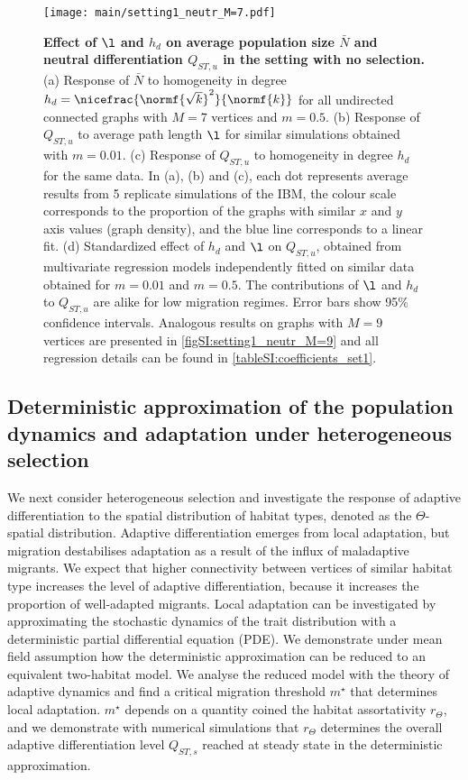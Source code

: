 \begin{figure}[ht]
    \centering
      \texttt{[image: main/setting1\_neutr\_M=7.pdf]}
      \caption{ 
      \textbf{Effect of $\l$ and $h_d$ on average population size $\bar{N}$ and neutral differentiation $Q_{ST,u}$ in the setting with no selection.}
      (a) Response of $\bar{N}$ to homogeneity in degree $h_d = \nicefrac{\normf{\sqrt{k}}^2}{\normf{k}}$ for all undirected connected graphs with $M=7$ vertices and $m=0.5$.
      (b) Response of $Q_{ST,u}$ to average path length $\l$ for similar simulations obtained with $m=0.01$.
      (c) Response of $Q_{ST,u}$ to homogeneity in degree $h_d$ for the same data.
      In (a), (b) and (c), each dot represents average results from 5 replicate simulations of the IBM, the colour scale corresponds to the proportion of the graphs with similar $x$ and $y$ axis values (graph density), and the blue line corresponds to a linear fit. 
      (d) Standardized effect of $h_d$ and $\l$ on $Q_{ST,u}$, obtained from multivariate regression models independently fitted on similar data obtained for $m = 0.01$ and $m=0.5$.
      The contributions of $\l$ and $h_d$ to $Q_{ST,u}$ are alike for low migration regimes. Error bars show 95\% confidence intervals.
      Analogous results on graphs with $M=9$ vertices are presented in \cref{figSI:setting1_neutr_M=9} and all regression details can be found in \cref{tableSI:coefficients_set1}.
       }
      \label{fig:setting1_neutr_M=7}
\end{figure}
\FloatBarrier

\subsection{Deterministic approximation of the population dynamics and adaptation under heterogeneous selection}\label{sec:result2a}

We next consider heterogeneous selection and investigate the response of adaptive differentiation to the spatial distribution of habitat types, denoted as the $\Theta$-spatial distribution. 
%
Adaptive differentiation emerges from local adaptation, but migration destabilises adaptation as a result of the influx of maladaptive migrants. We expect that higher connectivity between vertices of similar habitat type increases the level of adaptive differentiation, because it increases the proportion of well-adapted migrants. Local adaptation can be investigated by approximating the stochastic dynamics of the trait distribution with a deterministic partial differential equation (PDE). We demonstrate under mean field assumption how the deterministic approximation can be reduced to an equivalent two-habitat model. We analyse the reduced model with the theory of adaptive dynamics \citep{Meszena1997,Mirrahimi2020} and find a critical migration threshold $m^\star$ that determines local adaptation. $m^\star$ depends on a quantity coined the habitat assortativity $r_\Theta$, and we demonstrate with numerical simulations that $r_\Theta$ determines the overall adaptive differentiation level $Q_{ST,s}$ reached at steady state in the deterministic approximation.

